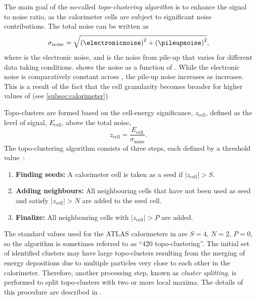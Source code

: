 The main goal of the so-called \emph{topo-clustering algorithm} is to enhance the signal to noise ratio, as the calorimeter cells are subject to significant noise contributions. The total noise can be written as
\begin{equation}
    \sigma_{\text{noise}} = \sqrt{ \left( \electronicnoise  \right)^2  + \left( \pileupnoise  \right)^2 },
\end{equation}
where \electronicnoise is the electronic noise, and \pileupnoise is the noise from pile-up that varies for different data taking conditions.  shows the noise as a function of \abseta. While the electronic noise is comparatively constant across \abseta, the pile-up noise increases as \abseta increases. This is a result of the fact that the cell granularity becomes broader for higher values of \abseta (see \cref{subsec:calorimeter}).

Topo-clusters are formed based on the cell-energy significance, $z_{\text{cell}}$, defined as the level of signal, $E_{\text{cell}}$, above the total noise,
\begin{equation}
    z_{\text{cell}} = \frac{E_{\text{cell}}}{\sigma_{\text{noise}}}.
\end{equation}
The topo-clustering algorithm consists of three steps, each defined by a threshold value~\cite{PERF-2014-07}:
\begin{enumerate}
    \item \textbf{Finding seeds:} A calorimeter cell is taken as a seed if $|z_{\text{cell}}| > S$.
    \item \textbf{Adding neighbours:} All neighbouring cells that have not been used as seed and satisfy $|z_{\text{cell}}| > N$ are added to the seed cell.
    \item \textbf{Finalize: } All neighbouring cells with $|z_{\text{cell}}| > P$ are added.
\end{enumerate}
The standard values used for the ATLAS calorimeters in \RunTwo are $S = 4$, $N = 2$, $P = 0$, so the algorithm is sometimes referred to as ``420 topo-clustering''.
The initial set of identified clusters may have large topo-clusters resulting from the merging of energy depositions due to multiple particles very close to each other in the calorimeter.
Therefore, another processing step, known as \emph{cluster splitting}, is performed to split topo-clusters with two or more local maxima. The details of this procedure are described in .

